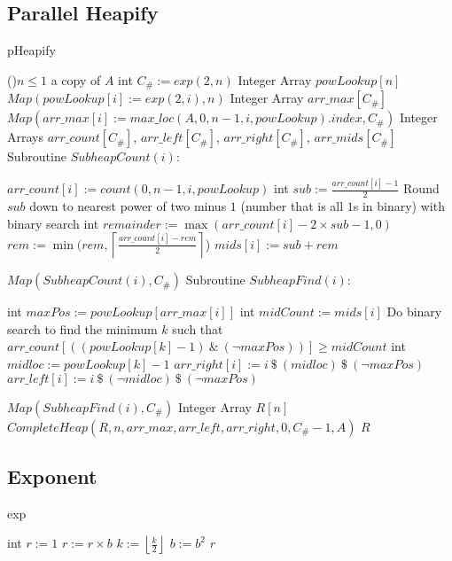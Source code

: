 \documentclass[letterpaper, reqno, 11pt]{article}
\begin{document}
\subsection*{Parallel Heapify}
\begin{algorithm}[H]
\caption{pHeapify}
\If(){$n\leq1$}
{
	\Return a copy of $A$\;
}
int $C_\#:=exp(2, n)$
Integer Array $powLookup[n]$\;
$Map(powLookup[i]:=exp(2,i),n)$
Integer Array $arr\_max[C_\#]$
$Map(arr\_max[i]:=max\_loc(A,0,n-1,i,powLookup).index, C_\#)$\;
Integer Arrays $arr\_count[C_\#]$, $arr\_left[C_\#]$, $arr\_right[C_\#]$, $arr\_mids[C_\#]$\;
Subroutine $SubheapCount(i)$:
\begin{description}
	\item{}
	$arr\_count[i]:=count(0,n-1,i,powLookup)$\;
	int $sub:=\frac{arr\_count[i]-1}{2}$\;
	Round $sub$ down to nearest power of two minus $1$
	(number that is all $1$s in binary) with binary search\;
	int $remainder:=\max(arr\_count[i]-2\times sub-1,0)$
	$rem:=\min(rem,\left\lceil\frac{arr\_count[i]-rem}{2}\right\rceil$)
	$mids[i]:=sub+rem$
\end{description}
$Map(SubheapCount(i), C_\#)$\;
Subroutine $SubheapFind(i)$:
\begin{description}
	\item{}
	int $maxPos:=powLookup[arr\_max[i]]$
	int $midCount:=mids[i]$
	Do binary search to find the minimum $k$ such that
	$arr\_count[((powLookup[k]-1)\ \&\ (\neg maxPos))]\geq midCount$
	int $midloc:=powLookup[k]-1$
	$arr\_right[i]:=i\ \$\ (midloc)\ \$\ (\neg maxPos)$\;
	$arr\_left[i]:=i\ \$\ (\neg midloc)\ \$\ (\neg maxPos)$\;
\end{description}
$Map(SubheapFind(i), C_\#)$\;
Integer Array $R[n]$\;
$CompleteHeap(R, n, arr\_max, arr\_left, arr\_right, 0, C_\#-1, A)$\;
\Return $R$\;
\end{algorithm}

\subsection*{Exponent}
\begin{algorithm}[H]
\caption{exp}
int $r:=1$
{
	{
		$r:=r\times b$\;
	}
	$k:=\left\lfloor\frac{k}{2}\right\rfloor$\;
	$b:=b^2$\;
}
\Return $r$\;
\end{algorithm}
\end{document}
